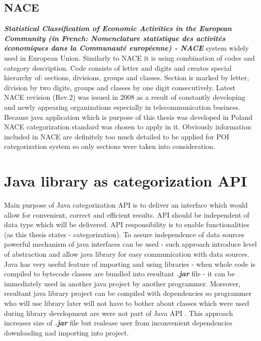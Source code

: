 \subsection{NACE}
\textit{\textbf{Statistical Classification of Economic Activities in the European Community (in French: Nomenclature statistique des activités économiques dans la Communauté européenne) - NACE}} system widely used in European Union. Similarly to NACE it is using combination of codes and category description. Code consists of letter and digits and creates special hierarchy of: sections, divisions, groups and classes. Section is marked by letter, division by two digits, groups and classes by one digit consecutively. Latest NACE revision (Rev.2) was issued in 2008 as a result of constantly developing and  newly appearing organizations especially in telecommunication business.\cite{17} \cite{18} Because java application which is purpose of this thesis was developed in Poland NACE categorization standard was chosen to apply in it. Obviously information included in NACE are definitely too much detailed to be applied for POI categorization system so only sections were taken into consideration. 

\section{Java library as categorization API}
Main purpose of Java categorization API is to deliver an interface which would allow for convenient, correct and efficient results. API should be independent of data type which will be delivered. API responsibility is to enable functionalities (as this thesis states - categorization). To assure independence of data sources powerful mechanism of java interfaces can be used - such approach introduce level of abstraction and allow java library for easy communication with data sources. Java has very useful feature of importing and using libraries - when whole code is compiled to bytecode classes are bundled into resultant \textbf{\textit{.jar}} file - it can be immediately used in another java project by another programmer. Moreover, resultant java library project can be compiled with dependencies so programmer who will use library later will not have to bother about classes which were used during library development are were not part of Java API \cite{19}. This approach increases size of \textbf{\textit{.jar}} file but realease user from inconvenient dependencies downloading nad importing into project.    

